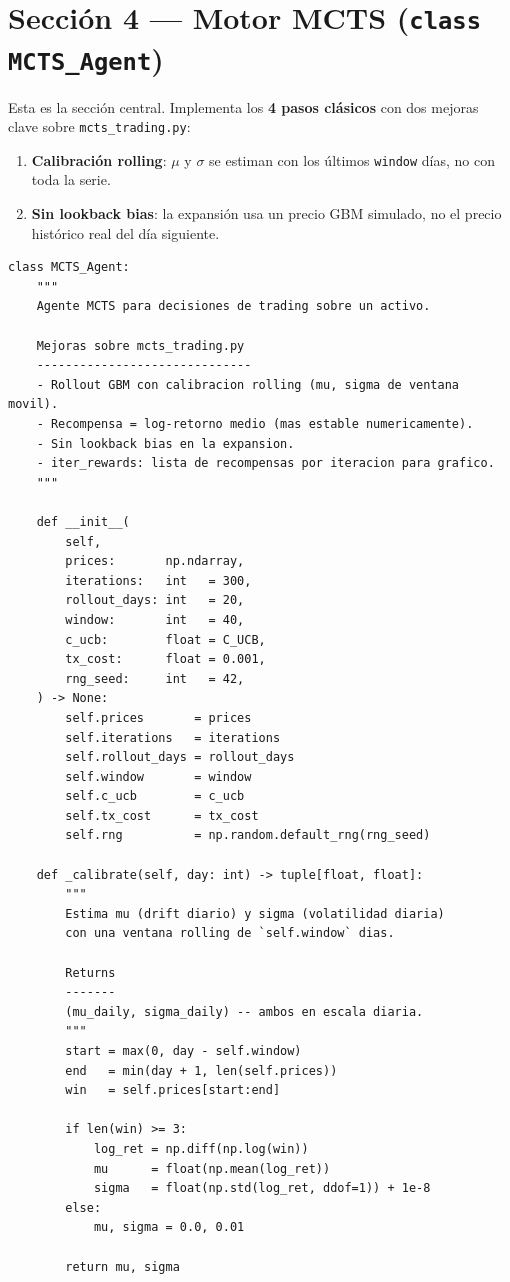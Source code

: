 \documentclass[12pt, a4paper]{article}
\begin{document}
\section{Sección 4 --- Motor MCTS (\texttt{class MCTS\_Agent})}

Esta es la sección central. Implementa los \textbf{4 pasos clásicos} con dos
mejoras clave sobre \texttt{mcts\_trading.py}:

\begin{enumerate}
  \item \textbf{Calibración rolling}: $\mu$ y $\sigma$ se estiman con los últimos
        \texttt{window} días, no con toda la serie.
  \item \textbf{Sin lookback bias}: la expansión usa un precio GBM simulado,
        no el precio histórico real del día siguiente.
\end{enumerate}

\begin{lstlisting}[caption={Clase \texttt{MCTS\_Agent} -- constructor y calibración}]
class MCTS_Agent:
    """
    Agente MCTS para decisiones de trading sobre un activo.

    Mejoras sobre mcts_trading.py
    ------------------------------
    - Rollout GBM con calibracion rolling (mu, sigma de ventana movil).
    - Recompensa = log-retorno medio (mas estable numericamente).
    - Sin lookback bias en la expansion.
    - iter_rewards: lista de recompensas por iteracion para grafico.
    """

    def __init__(
        self,
        prices:       np.ndarray,
        iterations:   int   = 300,
        rollout_days: int   = 20,
        window:       int   = 40,
        c_ucb:        float = C_UCB,
        tx_cost:      float = 0.001,
        rng_seed:     int   = 42,
    ) -> None:
        self.prices       = prices
        self.iterations   = iterations
        self.rollout_days = rollout_days
        self.window       = window
        self.c_ucb        = c_ucb
        self.tx_cost      = tx_cost
        self.rng          = np.random.default_rng(rng_seed)

    def _calibrate(self, day: int) -> tuple[float, float]:
        """
        Estima mu (drift diario) y sigma (volatilidad diaria)
        con una ventana rolling de `self.window` dias.

        Returns
        -------
        (mu_daily, sigma_daily) -- ambos en escala diaria.
        """
        start = max(0, day - self.window)
        end   = min(day + 1, len(self.prices))
        win   = self.prices[start:end]

        if len(win) >= 3:
            log_ret = np.diff(np.log(win))
            mu      = float(np.mean(log_ret))
            sigma   = float(np.std(log_ret, ddof=1)) + 1e-8
        else:
            mu, sigma = 0.0, 0.01

        return mu, sigma
\end{lstlisting}
\end{document}
